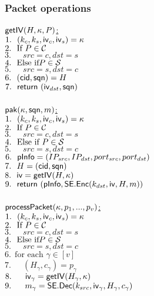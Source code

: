 \subsubsection{Packet operations}
\noindent
\underline{$\mathsf{getIV}(H, \kappa, P)$:} \\
 $1.\ \ (k_c, k_s, \mathsf{iv}_c, \mathsf{iv}_s) = \kappa$ \\
 $2.\ \ \text{If } P \in \mathcal{C}$ \\
 $3.\ \ \quad src = c, dst = s$ \\
 $4.\ \ \text{Else if} P \in \Server$ \\
 $5.\ \ \quad src = s, dst = c$ \\
 $6.\ \ (\mathsf{cid}, \mathsf{sqn}) = H$ \\
 $7.\ \ \mathsf{return}\ (\mathsf{iv}_{dst}, \mathsf{sqn})$ \\
\\
\underline{$\mathsf{pak}(\kappa, \mathsf{sqn}, m)$:} \\
 $1.\ \ (k_c, k_s, \mathsf{iv}_c, \mathsf{iv}_s) = \kappa$ \\
 $2.\ \ \text{If } P \in \mathcal{C}$ \\
 $3.\ \ \quad src = c, dst = s$ \\
 $4.\ \ \text{Else if } P \in \Server$ \\
 $5.\ \ \quad src = s, dst = c$ \\
 $6.\ \ \mathsf{pInfo} = (IP_{src}, IP_{dst}, port_{src}, port_{dst})$ \\
 $7.\ \ H = (\mathsf{cid}, \mathsf{sqn})$ \\
 $8.\ \ \mathsf{iv} = \mathsf{getIV}(H, \kappa)$ \\
 $9.\ \ \mathsf{return}\ (\mathsf{pInfo}, \mathsf{SE}.\mathsf{Enc}(k_{dst}, \mathsf{iv}, H, m) )$ \\
\\
\underline{$\mathsf{processPacket}(\kappa, p_1,...,p_v)$:} \\
 $1.\ \ (k_c, k_s, \mathsf{iv}_c, \mathsf{iv}_s) = \kappa$ \\
 $2.\ \ \text{If } P \in \mathcal{C}$ \\
 $3.\ \ \quad src = c, dst = s$ \\
 $4.\ \ \text{Else if} P \in \Server$ \\
 $5.\ \ \quad src = s, dst = c$ \\
 $6.\ \ \text{for each } \gamma \in [v]$ \\
 $7.\ \ \quad (H_{\gamma}, c_{\gamma}) = p_{\gamma}$ \\
 $8.\ \ \quad \mathsf{iv}_{\gamma} = \mathsf{getIV}(H_{\gamma}, \kappa)$ \\
 $9.\ \ \quad m_{\gamma} = \mathsf{SE}.\mathsf{Dec}(k_{src}, \mathsf{iv}_{\gamma}, H_{\gamma}, c_{\gamma})$ \\